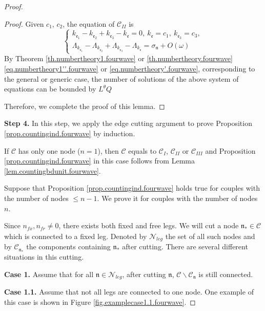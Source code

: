 \begin{proof}
\begin{proof}
     Given $c_1$, $c_2$, the equation of $\mathcal{C}_{II}$ is 
     \begin{equation}
     \begin{cases}
     k_{\mathfrak{e}_1}-k_{\mathfrak{e}_2}+k_{\mathfrak{e}_3}-k_{\mathfrak{e}}=0,\ k_{\mathfrak{e}}=c_1,\ k_{\mathfrak{e}_3}=c_3,
     \\
     \Lambda_{k_{\mathfrak{e}_1}}-\Lambda_{k_{\mathfrak{e}_2}}+\Lambda_{k_{\mathfrak{e}_3}}-\Lambda_{k_{\mathfrak{e}}}=\sigma_{\mathfrak{n}}+O(\omega)
     \end{cases}
     \end{equation}
     By Theorem \ref{th.numbertheory1.fourwave} or \ref{th.numbertheory.fourwave} \eqref{eq.numbertheory1''.fourwave} or \eqref{eq.numbertheory'.fourwave}, corresponding to the general or generic case, the number of solutions of the above system of equations can be bounded by $ L^\theta Q$
     
     Therefore, we complete the proof of this lemma.
     \end{proof}
    
    \textbf{Step 4.} In this step, we apply the edge cutting argument to prove Proposition \ref{prop.countingind.fourwave} by induction.
    
    If $\mathcal{C}$ has only one node ($n=1$), then $\mathcal{C}$ equals to $\mathcal{C}_{I}$, $\mathcal{C}_{II}$ or $\mathcal{C}_{III}$ and Proposition \ref{prop.countingind.fourwave} in this case follows from Lemma \ref{lem.countingbdunit.fourwave}.
    
    Suppose that Proposition \ref{prop.countingind.fourwave} holds true for couples with the number of nodes $\le n-1$. We prove it for couples with the number of nodes $n$. 
    
    Since $n_{\textit{fx}}, n_{\textit{fr}}\ne 0$, there exists both fixed and free legs. We will cut a node $\mathfrak{n}_*\in\mathcal{C}$ which is connected to a fixed leg. Denoted by $\mathcal{N}_{leg}$ the set of all such nodes and by $\mathcal{C}_{\mathfrak{n}_*}$ the components containing $\mathfrak{n}_*$ after cutting. There are several different situations in this cutting.
    
    \textbf{Case 1.} Assume that for all $\mathfrak{n}\in \mathcal{N}_{leg}$, after cutting $\mathfrak{n}$, $\mathcal{C}\backslash \mathcal{C}_{\mathfrak{n}}$ is still connected.
    
    \textbf{Case 1.1.} Assume that not all legs are connected to one node. One example of this case is shown in Figure \ref{fig.examplecase1.1.fourwave}.
    

\end{proof}

